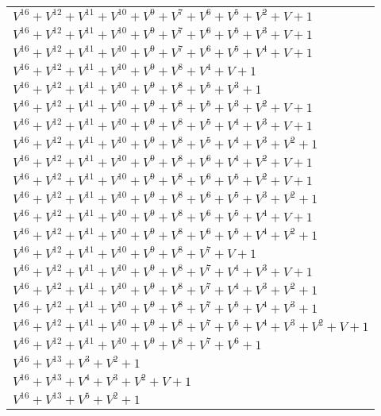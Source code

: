 \documentclass[12pt]{article}
\begin{document}
\begin{adjustwidth}{-4cm}{}
\begin{center}
\begin{longtable}{|l|}
$V^{16}  +V^{12}  +V^{11}  +V^{10}  +V^{9}  +V^{7}  +V^{6}  +V^{5}  +V^{2}  + V + 1$ \\
$V^{16}  +V^{12}  +V^{11}  +V^{10}  +V^{9}  +V^{7}  +V^{6}  +V^{5}  +V^{3}  + V + 1$ \\
$V^{16}  +V^{12}  +V^{11}  +V^{10}  +V^{9}  +V^{7}  +V^{6}  +V^{5}  +V^{4}  + V + 1$ \\
$V^{16}  +V^{12}  +V^{11}  +V^{10}  +V^{9}  +V^{8}  +V^{4}  + V + 1$ \\
$V^{16}  +V^{12}  +V^{11}  +V^{10}  +V^{9}  +V^{8}  +V^{5}  +V^{3}  + 1$ \\
$V^{16}  +V^{12}  +V^{11}  +V^{10}  +V^{9}  +V^{8}  +V^{5}  +V^{3}  +V^{2}  + V + 1$ \\
$V^{16}  +V^{12}  +V^{11}  +V^{10}  +V^{9}  +V^{8}  +V^{5}  +V^{4}  +V^{3}  + V + 1$ \\
$V^{16}  +V^{12}  +V^{11}  +V^{10}  +V^{9}  +V^{8}  +V^{5}  +V^{4}  +V^{3}  +V^{2}  + 1$ \\
$V^{16}  +V^{12}  +V^{11}  +V^{10}  +V^{9}  +V^{8}  +V^{6}  +V^{4}  +V^{2}  + V + 1$ \\
$V^{16}  +V^{12}  +V^{11}  +V^{10}  +V^{9}  +V^{8}  +V^{6}  +V^{5}  +V^{2}  + V + 1$ \\
$V^{16}  +V^{12}  +V^{11}  +V^{10}  +V^{9}  +V^{8}  +V^{6}  +V^{5}  +V^{3}  +V^{2}  + 1$ \\
$V^{16}  +V^{12}  +V^{11}  +V^{10}  +V^{9}  +V^{8}  +V^{6}  +V^{5}  +V^{4}  + V + 1$ \\
$V^{16}  +V^{12}  +V^{11}  +V^{10}  +V^{9}  +V^{8}  +V^{6}  +V^{5}  +V^{4}  +V^{2}  + 1$ \\
$V^{16}  +V^{12}  +V^{11}  +V^{10}  +V^{9}  +V^{8}  +V^{7}  + V + 1$ \\
$V^{16}  +V^{12}  +V^{11}  +V^{10}  +V^{9}  +V^{8}  +V^{7}  +V^{4}  +V^{3}  + V + 1$ \\
$V^{16}  +V^{12}  +V^{11}  +V^{10}  +V^{9}  +V^{8}  +V^{7}  +V^{4}  +V^{3}  +V^{2}  + 1$ \\
$V^{16}  +V^{12}  +V^{11}  +V^{10}  +V^{9}  +V^{8}  +V^{7}  +V^{5}  +V^{4}  +V^{3}  + 1$ \\
$V^{16}  +V^{12}  +V^{11}  +V^{10}  +V^{9}  +V^{8}  +V^{7}  +V^{5}  +V^{4}  +V^{3}  +V^{2}  + V + 1$ \\
$V^{16}  +V^{12}  +V^{11}  +V^{10}  +V^{9}  +V^{8}  +V^{7}  +V^{6}  + 1$ \\
$V^{16}  +V^{13}  +V^{3}  +V^{2}  + 1$ \\
$V^{16}  +V^{13}  +V^{4}  +V^{3}  +V^{2}  + V + 1$ \\
$V^{16}  +V^{13}  +V^{5}  +V^{2}  + 1$ \\

\end{longtable}
\end{center}
\end{adjustwidth}
\end{document}
